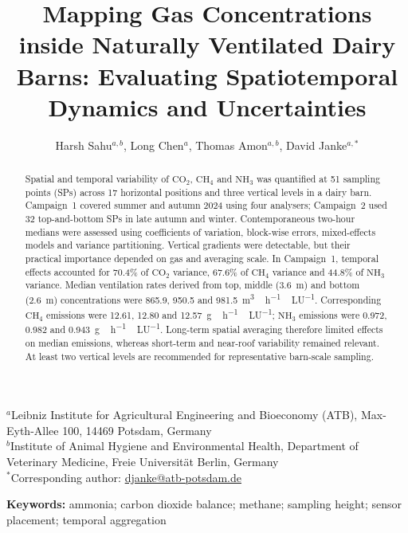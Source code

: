 \documentclass[12pt,a4paper]{article}
\title{Mapping Gas Concentrations inside Naturally Ventilated Dairy Barns: Evaluating Spatiotemporal Dynamics and Uncertainties}
\author{Harsh Sahu$^{a,b}$, Long Chen$^{a}$, Thomas Amon$^{a,b}$, David Janke$^{a,*}$}
\date{}
\begin{document}
\maketitle
\begin{center}\small
$^{a}$Leibniz Institute for Agricultural Engineering and Bioeconomy (ATB), Max-Eyth-Allee 100, 14469 Potsdam, Germany\\
$^{b}$Institute of Animal Hygiene and Environmental Health, Department of Veterinary Medicine, Freie Universit\"at Berlin, Germany\\
$^{*}$Corresponding author: \href{mailto:djanke@atb-potsdam.de}{djanke@atb-potsdam.de}
\end{center}

\begin{abstract}
Spatial and temporal variability of \(\mathrm{CO_2}\), \(\mathrm{CH_4}\) and \(\mathrm{NH_3}\) was quantified at 51 sampling points (SPs) across 17 horizontal positions and three vertical levels in a dairy barn. Campaign~1 covered summer and autumn 2024 using four analysers; Campaign~2 used 32 top-and-bottom SPs in late autumn and winter. Contemporaneous two-hour medians were assessed using coefficients of variation, block-wise errors, mixed-effects models and variance partitioning. Vertical gradients were detectable, but their practical importance depended on gas and averaging scale. In Campaign~1, temporal effects accounted for 70.4\% of \(\mathrm{CO_2}\) variance, 67.6\% of \(\mathrm{CH_4}\) variance and 44.8\% of \(\mathrm{NH_3}\) variance. Median ventilation rates derived from top, middle (\SI{3.6}{m}) and bottom (\SI{2.6}{m}) concentrations were 865.9, 950.5 and \SI{981.5}{m^3\,h^{-1}\,LU^{-1}}. Corresponding \(\mathrm{CH_4}\) emissions were 12.61, 12.80 and \SI{12.57}{g\,h^{-1}\,LU^{-1}}; \(\mathrm{NH_3}\) emissions were 0.972, 0.982 and \SI{0.943}{g\,h^{-1}\,LU^{-1}}. Long-term spatial averaging therefore limited effects on median emissions, whereas short-term and near-roof variability remained relevant. At least two vertical levels are recommended for representative barn-scale sampling.
\end{abstract}

\noindent\textbf{Keywords:} ammonia; carbon dioxide balance; methane; sampling height; sensor placement; temporal aggregation
\end{document}
